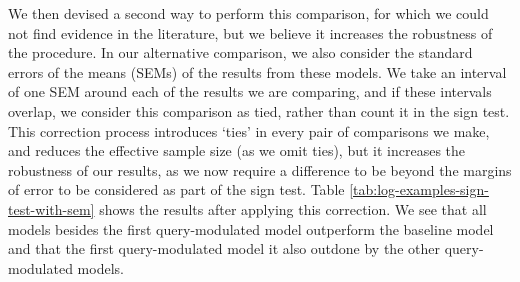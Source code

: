 We then devised a second way to perform this comparison, for which we could not find evidence in the literature, but we believe it increases the robustness of the procedure. In our alternative comparison, we also consider the standard errors of the means (SEMs) of the results from these models. We take an interval of one SEM around each of the results we are comparing, and if these intervals overlap, we consider this comparison as tied, rather than count it in the sign test. This correction process introduces ‘ties’ in every pair of comparisons we make, and reduces the effective sample size (as we omit ties), but it increases the robustness of our results, as we now require a difference to be beyond the margins of error to be considered as part of the sign test. Table \ref{tab:log-examples-sign-test-with-sem} shows the results after applying this correction. We see that all models besides the first query-modulated model outperform the baseline model and that the first query-modulated model it also outdone by the other query-modulated models.

